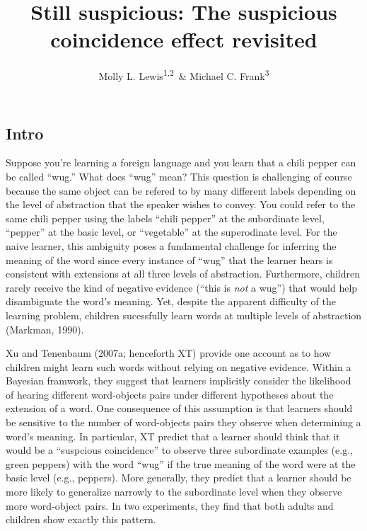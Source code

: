 \documentclass[english,floatsintext,man]{apa6}
\title{Still suspicious: The suspicious coincidence effect revisited}
\author{Molly L. Lewis\textsuperscript{1,2}~\& Michael C. Frank\textsuperscript{3}}
\affiliation{
    \vspace{0.5cm}
          \textsuperscript{1} Computation Institute, University of Chicago\\
          \textsuperscript{2} Department of Psychology, University of Wisconsin, Madison\\
          \textsuperscript{3} Department of Psychology, Stanford University  }
\theoremstyle{definition}
\theoremstyle{definition}
\theoremstyle{remark}
\begin{document}
\maketitle

\setcounter{secnumdepth}{0}



\subsection{Intro}\label{intro}

Suppose you're learning a foreign language and you learn that a chili
pepper can be called \enquote{wug.} What does \enquote{wug} mean? This
question is challenging of course because the same object can be refered
to by many different labels depending on the level of abstraction that
the speaker wishes to convey. You could refer to the same chili pepper
using the labels \enquote{chili pepper} at the subordinate level,
\enquote{pepper} at the basic level, or \enquote{vegetable} at the
superodinate level. For the naive learner, this ambiguity poses a
fundamental challenge for inferring the meaning of the word since every
instance of \enquote{wug} that the learner hears is consistent with
extensions at all three levels of abstraction. Furthermore, children
rarely receive the kind of negative evidence (\enquote{this is
\emph{not} a wug}) that would help disambiguate the word's meaning. Yet,
despite the apparent difficulty of the learning problem, children
sucessfully learn words at multiple levels of abstraction (Markman,
1990).

Xu and Tenenbaum (2007a; henceforth XT) provide one account as to how
children might learn such words without relying on negative evidence.
Within a Bayesian framwork, they suggest that learners implicitly
consider the likelihood of hearing different word-objects pairs under
different hypotheses about the extension of a word. One consequence of
this assumption is that learners should be sensitive to the number of
word-objects pairs they observe when determining a word's meaning. In
particular, XT predict that a learner should think that it would be a
\enquote{suspcious coincidence} to observe three subordinate examples
(e.g., green peppers) with the word \enquote{wug} if the true meaning of
the word were at the basic level (e.g., peppers). More generally, they
predict that a learner should be more likely to generalize narrowly to
the subordinate level when they observe more word-object pairs. In two
experiments, they find that both adults and children show exactly this
pattern.
\end{document}
